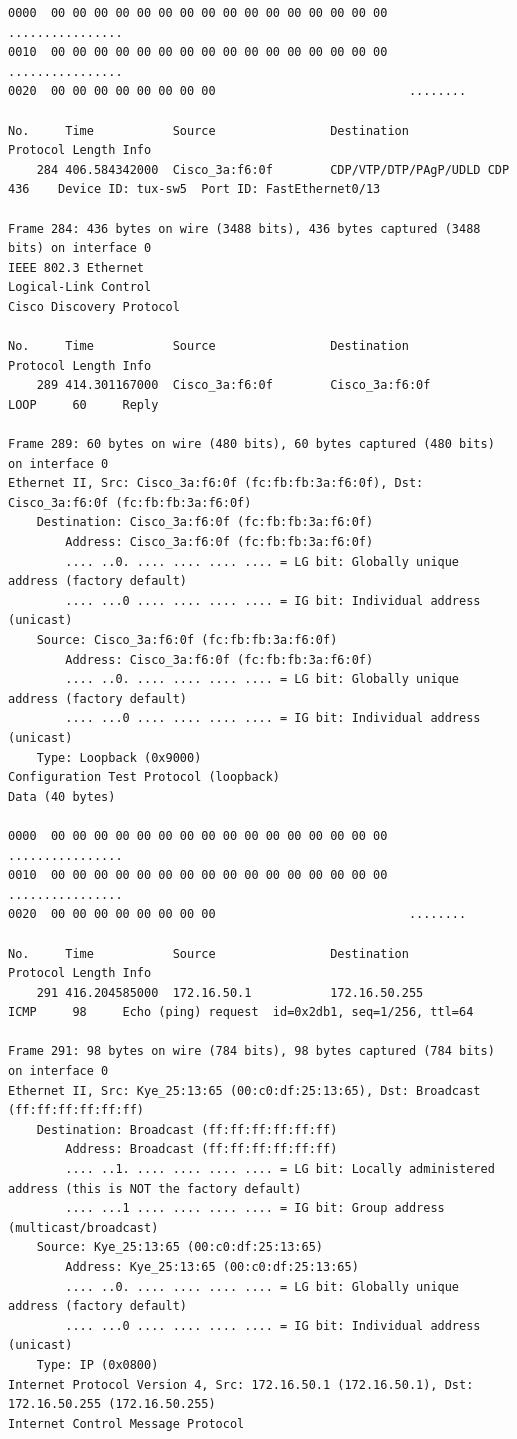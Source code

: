 \documentclass[a4paper,11pt]{article}
\begin{document}
\begin{lstlisting}
0000  00 00 00 00 00 00 00 00 00 00 00 00 00 00 00 00   ................
0010  00 00 00 00 00 00 00 00 00 00 00 00 00 00 00 00   ................
0020  00 00 00 00 00 00 00 00                           ........

No.     Time           Source                Destination           Protocol Length Info
    284 406.584342000  Cisco_3a:f6:0f        CDP/VTP/DTP/PAgP/UDLD CDP      436    Device ID: tux-sw5  Port ID: FastEthernet0/13  

Frame 284: 436 bytes on wire (3488 bits), 436 bytes captured (3488 bits) on interface 0
IEEE 802.3 Ethernet 
Logical-Link Control
Cisco Discovery Protocol

No.     Time           Source                Destination           Protocol Length Info
    289 414.301167000  Cisco_3a:f6:0f        Cisco_3a:f6:0f        LOOP     60     Reply

Frame 289: 60 bytes on wire (480 bits), 60 bytes captured (480 bits) on interface 0
Ethernet II, Src: Cisco_3a:f6:0f (fc:fb:fb:3a:f6:0f), Dst: Cisco_3a:f6:0f (fc:fb:fb:3a:f6:0f)
    Destination: Cisco_3a:f6:0f (fc:fb:fb:3a:f6:0f)
        Address: Cisco_3a:f6:0f (fc:fb:fb:3a:f6:0f)
        .... ..0. .... .... .... .... = LG bit: Globally unique address (factory default)
        .... ...0 .... .... .... .... = IG bit: Individual address (unicast)
    Source: Cisco_3a:f6:0f (fc:fb:fb:3a:f6:0f)
        Address: Cisco_3a:f6:0f (fc:fb:fb:3a:f6:0f)
        .... ..0. .... .... .... .... = LG bit: Globally unique address (factory default)
        .... ...0 .... .... .... .... = IG bit: Individual address (unicast)
    Type: Loopback (0x9000)
Configuration Test Protocol (loopback)
Data (40 bytes)

0000  00 00 00 00 00 00 00 00 00 00 00 00 00 00 00 00   ................
0010  00 00 00 00 00 00 00 00 00 00 00 00 00 00 00 00   ................
0020  00 00 00 00 00 00 00 00                           ........

No.     Time           Source                Destination           Protocol Length Info
    291 416.204585000  172.16.50.1           172.16.50.255         ICMP     98     Echo (ping) request  id=0x2db1, seq=1/256, ttl=64

Frame 291: 98 bytes on wire (784 bits), 98 bytes captured (784 bits) on interface 0
Ethernet II, Src: Kye_25:13:65 (00:c0:df:25:13:65), Dst: Broadcast (ff:ff:ff:ff:ff:ff)
    Destination: Broadcast (ff:ff:ff:ff:ff:ff)
        Address: Broadcast (ff:ff:ff:ff:ff:ff)
        .... ..1. .... .... .... .... = LG bit: Locally administered address (this is NOT the factory default)
        .... ...1 .... .... .... .... = IG bit: Group address (multicast/broadcast)
    Source: Kye_25:13:65 (00:c0:df:25:13:65)
        Address: Kye_25:13:65 (00:c0:df:25:13:65)
        .... ..0. .... .... .... .... = LG bit: Globally unique address (factory default)
        .... ...0 .... .... .... .... = IG bit: Individual address (unicast)
    Type: IP (0x0800)
Internet Protocol Version 4, Src: 172.16.50.1 (172.16.50.1), Dst: 172.16.50.255 (172.16.50.255)
Internet Control Message Protocol


\end{lstlisting}
\end{document}
